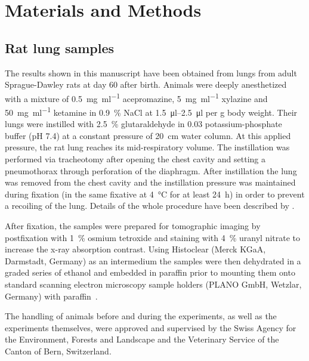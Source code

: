 \documentclass[%
	paper=a4,%
	abstract=true,%
	]{scrartcl}
\begin{document}
\section{Materials and Methods}
\subsection{Rat lung samples}
The results shown in this manuscript have been obtained from lungs from adult Sprague-Dawley rats at day 60 after birth. Animals were deeply anesthetized with a mixture of %
\SI{0.5}{\milli\gram\per\milli\litre} acepromazine, %
\SI{5}{\milli\gram\per\milli\litre} xylazine and %
\SI{50}{\milli\gram\per\milli\litre} ketamine in %
\SI{0.9}{\percent} NaCl at \SIrange{1.5}{2.5}{\micro\litre} per \si{\gram} body weight. Their lungs were instilled with \SI{2.5}{\percent} glutaraldehyde in \SI{0.03}{\Molar} potassium-phosphate buffer (pH 7.4) at a constant pressure of \SI{20}{\centi\meter} water column. At this applied pressure, the rat lung reaches its mid-respiratory volume. The instillation was performed via tracheotomy after opening the chest cavity and setting a pneumothorax through perforation of the diaphragm. After instillation the lung was removed from the chest cavity and the instillation pressure was maintained during fixation (in the same fixative at \SI{4}{\celsius} for at least \SI{24}{\hour}) in order to prevent a recoiling of the lung. Details of the whole procedure have been described by \citet{Tschanz2002}.

After fixation, the samples were prepared for tomographic imaging by postfixation with \SI{1}{\percent} osmium tetroxide and staining with \SI{4}{\percent} uranyl nitrate to increase the x-ray absorption contrast. Using Histoclear (Merck KGaA, Darmstadt, Germany) as an intermedium the samples were then dehydrated in a graded series of ethanol and embedded in paraffin prior to mounting them onto standard scanning electron microscopy sample holders (PLANO GmbH, Wetzlar, Germany) with paraffin~\cite{Tsuda2008}.

The handling of animals before and during the experiments, as well as the experiments themselves, were approved and supervised by the Swiss Agency for the Environment, Forests and Landscape and the Veterinary Service of the Canton of Bern, Switzerland.
\end{document}
